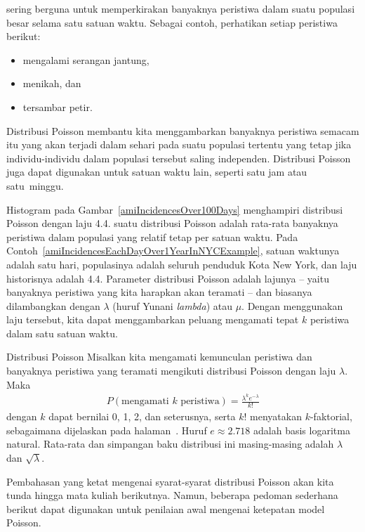  sering berguna untuk memperkirakan banyaknya peristiwa dalam suatu populasi besar selama satu satuan waktu. Sebagai contoh, perhatikan setiap peristiwa berikut:
\begin{itemize}
\setlength{\itemsep}{0mm}
\item mengalami serangan jantung,
\item menikah, dan
\item tersambar petir.
\end{itemize}
Distribusi Poisson membantu kita menggambarkan banyaknya peristiwa semacam itu yang akan terjadi dalam sehari pada suatu populasi tertentu yang tetap jika individu-individu dalam populasi tersebut saling independen. Distribusi Poisson juga dapat digunakan untuk satuan waktu lain, seperti satu jam atau satu~minggu.

Histogram pada Gambar~\ref{amiIncidencesOver100Days} menghampiri distribusi Poisson dengan laju 4.4.  suatu distribusi Poisson adalah rata-rata banyaknya peristiwa dalam populasi yang relatif tetap per satuan waktu. Pada Contoh~\ref{amiIncidencesEachDayOver1YearInNYCExample}, satuan waktunya adalah satu hari, populasinya adalah seluruh penduduk Kota New York, dan laju historisnya adalah 4.4. Parameter distribusi Poisson adalah lajunya -- yaitu banyaknya peristiwa yang kita harapkan akan teramati -- dan biasanya dilambangkan dengan $\lambda$
(huruf Yunani \emph{lambda}) atau $\mu$. Dengan menggunakan laju tersebut, kita dapat menggambarkan peluang mengamati tepat $k$ peristiwa dalam satu satuan waktu.

\D{\newpage}

\begin{onebox}{Distribusi Poisson}
  Misalkan kita mengamati kemunculan peristiwa dan banyaknya
  peristiwa yang teramati mengikuti distribusi Poisson
  dengan laju $\lambda$.
  Maka
  \begin{align*}
  P(\text{mengamati $k$ peristiwa})
      = \frac{\lambda^{k} e^{-\lambda}}{k!}
  \end{align*}
  dengan $k$ dapat bernilai 0, 1, 2, dan seterusnya,
  serta $k!$ menyatakan $k$-faktorial, sebagaimana dijelaskan pada
  halaman~\pageref{factorial_defined}.
  Huruf $e\approx2.718$ adalah basis logaritma
  natural.
  Rata-rata dan simpangan baku distribusi ini
  masing-masing adalah $\lambda$ dan $\sqrt{\lambda}$.
\end{onebox}

Pembahasan yang ketat mengenai syarat-syarat distribusi Poisson akan kita tunda hingga mata kuliah berikutnya. Namun, beberapa pedoman sederhana berikut dapat digunakan untuk penilaian awal mengenai ketepatan model Poisson.

